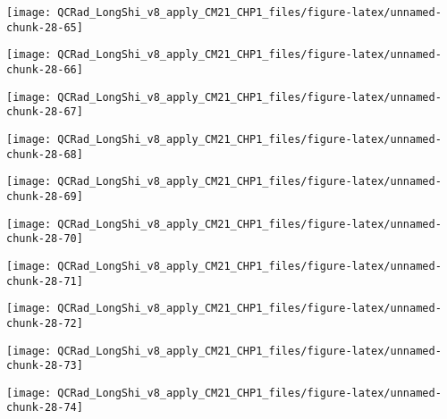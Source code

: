 \documentclass[
  10pt,
  a4paper,oneside]{article}
\begin{document}
\begin{center}\texttt{[image: QCRad\_LongShi\_v8\_apply\_CM21\_CHP1\_files/figure-latex/unnamed-chunk-28-65]} \end{center}

\begin{center}\texttt{[image: QCRad\_LongShi\_v8\_apply\_CM21\_CHP1\_files/figure-latex/unnamed-chunk-28-66]} \end{center}

\begin{center}\texttt{[image: QCRad\_LongShi\_v8\_apply\_CM21\_CHP1\_files/figure-latex/unnamed-chunk-28-67]} \end{center}

\begin{center}\texttt{[image: QCRad\_LongShi\_v8\_apply\_CM21\_CHP1\_files/figure-latex/unnamed-chunk-28-68]} \end{center}

\begin{center}\texttt{[image: QCRad\_LongShi\_v8\_apply\_CM21\_CHP1\_files/figure-latex/unnamed-chunk-28-69]} \end{center}

\begin{center}\texttt{[image: QCRad\_LongShi\_v8\_apply\_CM21\_CHP1\_files/figure-latex/unnamed-chunk-28-70]} \end{center}

\begin{center}\texttt{[image: QCRad\_LongShi\_v8\_apply\_CM21\_CHP1\_files/figure-latex/unnamed-chunk-28-71]} \end{center}

\begin{center}\texttt{[image: QCRad\_LongShi\_v8\_apply\_CM21\_CHP1\_files/figure-latex/unnamed-chunk-28-72]} \end{center}

\begin{center}\texttt{[image: QCRad\_LongShi\_v8\_apply\_CM21\_CHP1\_files/figure-latex/unnamed-chunk-28-73]} \end{center}

\begin{center}\texttt{[image: QCRad\_LongShi\_v8\_apply\_CM21\_CHP1\_files/figure-latex/unnamed-chunk-28-74]} \end{center}
\end{document}
